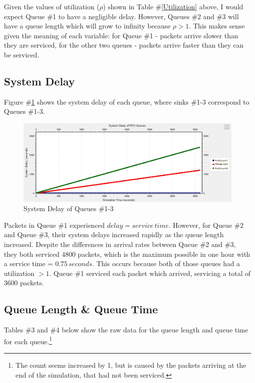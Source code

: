 \documentclass{article}
\begin{document}
Given the values of utilization ($\rho$) shown in Table \#\ref{Utilization} above, I would expect Queue \#1 to have a negligible delay.  However, Queues \#2 and \#3 will have a queue length which will grow to infinity because $\rho > 1$. 
This makes sense given the meaning of each variable:  for Queue \#1 - packets arrive slower than they are serviced, for the other two queues - packets arrive faster than they can be serviced.

\subsection*{System Delay}
Figure \#\ref{DelayPlot} shows the system delay of each queue, where sinks \#1-3 correspond to Queues \#1-3.

\begin{figure}[h!]
	\begin{center}
	\includegraphics[scale=0.65]{Images/DelayPlot.PNG}
	\vspace{-.25cm}
	\caption{System Delay of Queues \#1-3}
	\label{DelayPlot}
	\end{center}
\end{figure}

Packets in Queue \#1 experienced $delay = service \, time$.  However, for Queue \#2 and Queue \#3, their system delays increased rapidly as the queue length increased.  Despite the differences in arrival rates between Queue \#2 and \#3, they both serviced 4800 packets, which is the maximum possible in one hour with a service time = $0.75 \, seconds$.
This occurs because both of those queues had a utilization $> 1$.  
Queue \#1 serviced each packet which arrived, servicing a total of 3600 packets.

\newpage
\subsection*{Queue Length \& Queue Time}
Tables \#3 and \#4 below show the raw data for the queue length and queue time for each queue.\footnote{The count seems increased by 1, but is caused by the packets arriving at the end of the simulation, that had not been serviced.}
\vspace{.25cm}
\end{document}
